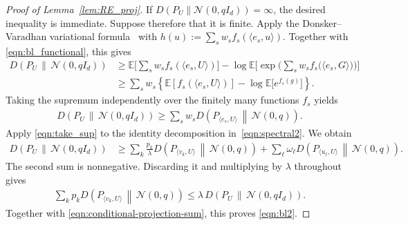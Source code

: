 \documentclass[11pt,onecolumn]{IEEEtran}
\newcommand{\calN}{\mathcal{N}}
\newcommand{\bbE}{\mathbb{E}}
\begin{document}
\begin{proof}[Proof of Lemma~\ref{lem:RE_proj}]
If $D(P_U\|\calN(0,qI_d))=\infty$, the desired inequality is immediate. Suppose therefore that it is finite. Apply the Donsker--Varadhan
variational formula~\cite{DonskerVaradhan1975,DupuisEllis1997} with
$
h(u):=\sum_sw_sf_s(\langle e_s,u\rangle).
$ 
Together with \eqref{eqn:bl_functional}, this gives
\begin{align}
D\left(P_U\,\middle\|\,\calN(0,qI_d)\right) &\ge
\mathbb E\bigg[
\sum_sw_sf_s(\langle e_s,U\rangle)
\bigg]
-
\log\bbE\bigg[\exp\bigg( \sum_s w_sf_s\big( \langle e_s, G\rangle\big) \bigg)\bigg]
\nonumber\\
&\ge
\sum_sw_s
\left\{
\mathbb E\left[f_s(\langle e_s,U\rangle)\right]
-
\log\mathbb E\big[e^{f_s(g)}\big]
\right\}.
\label{eqn:dv-bl}
\end{align}
Taking the supremum independently over the finitely many functions
$f_s$ yields
\begin{align}
D\left(P_U\,\middle\|\,\calN(0,qI_d)\right)
\ge
\sum_sw_s
D\left(
P_{\langle e_s,U\rangle}
\,\middle\|\,
\calN(0,q)
\right).
\label{eqn:take_sup}
\end{align}
Apply \eqref{eqn:take_sup} to the identity decomposition in~\eqref{eqn:spectral2}. We obtain
\begin{align}
D\left(P_U\,\middle\|\,\calN(0,qI_d)\right)
&\ge
\sum_k\frac{p_k}{\lambda}
D\left(
P_{\langle v_k,U\rangle}
\,\middle\|\,
\calN(0,q)
\right)
 +
\sum_\ell\omega_\ell
D\left(
P_{\langle u_\ell,U\rangle}
\,\middle\|\,
\calN(0,q)
\right).
\end{align}
The second sum is nonnegative. Discarding it and multiplying by
$\lambda$ throughout gives
\begin{align}
\sum_kp_k
D\left(
P_{\langle v_k,U\rangle}
\,\middle\|\,
\calN(0,q)
\right)
\le
\lambda\,
D\left(P_U\,\middle\|\,\calN(0,qI_d)\right).
\end{align}
Together with \eqref{eqn:conditional-projection-sum}, this proves
\eqref{eqn:bl2}.
\end{proof}
\end{document}

